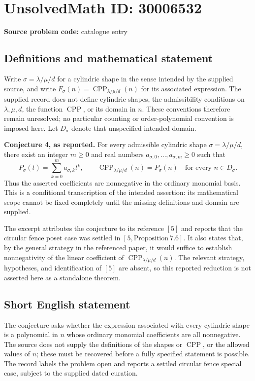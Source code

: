 \documentclass[11pt]{article}
\begin{document}
\section*{UnsolvedMath ID: 30006532}
\textbf{Source problem code:} catalogue entry
\subsection{Definitions and mathematical statement}
Write \(\sigma=\lambda/\mu/d\) for a cylindric shape in the sense intended by the supplied source, and write \(F_\sigma(n)=\operatorname{CPP}_{\lambda/\mu/d}(n)\) for its associated expression. The supplied record does not define cylindric shapes, the admissibility conditions on \(\lambda,\mu,d\), the function \(\operatorname{CPP}\), or its domain in \(n\). These conventions therefore remain unresolved; no particular counting or order-polynomial convention is imposed here. Let \(D_\sigma\) denote that unspecified intended domain.

\textbf{Conjecture 4, as reported.} For every admissible cylindric shape \(\sigma=\lambda/\mu/d\), there exist an integer \(m\geq 0\) and real numbers \(a_{\sigma,0},\ldots,a_{\sigma,m}\geq 0\) such that
\[
 P_\sigma(t)=\sum_{k=0}^{m}a_{\sigma,k}t^k,
 \qquad
 \operatorname{CPP}_{\lambda/\mu/d}(n)=P_\sigma(n)
 \quad\text{for every }n\in D_\sigma.
\]
Thus the asserted coefficients are nonnegative in the ordinary monomial basis. This is a conditional transcription of the intended assertion: its mathematical scope cannot be fixed completely until the missing definitions and domain are supplied.

The excerpt attributes the conjecture to its reference \([5]\) and reports that the circular fence poset case was settled in \([5,\mathrm{Proposition}\ 7.6]\). It also states that, by the general strategy in the referenced paper, it would suffice to establish nonnegativity of the linear coefficient of \(\operatorname{CPP}_{\lambda/\mu/d}(n)\). The relevant strategy, hypotheses, and identification of \([5]\) are absent, so this reported reduction is not asserted here as a standalone theorem.
\subsection{Short English statement}
The conjecture asks whether the expression associated with every cylindric shape is a polynomial in \(n\) whose ordinary monomial coefficients are all nonnegative. The source does not supply the definitions of the shapes or \(\operatorname{CPP}\), or the allowed values of \(n\); these must be recovered before a fully specified statement is possible. The record labels the problem open and reports a settled circular fence special case, subject to the supplied dated curation.
\end{document}
